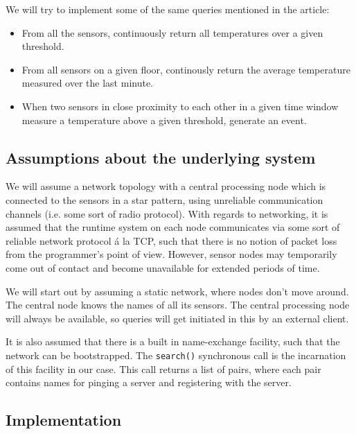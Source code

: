We will try to implement some of the same queries mentioned in the
article:

\begin{itemize}
\item
  From all the sensors, continuously return all temperatures over a
  given threshold.

\item
  From all sensors on a given floor, continously return the average
  temperature measured over the last minute.

\item
  When two sensors in close proximity to each other in a given time
  window measure a temperature above a given threshold, generate an
  event.

\end{itemize}
\subsection{Assumptions about the underlying system}

We will assume a network topology with a central processing node which is
connected to the sensors in a star pattern, using unreliable communication
channels (i.e. some sort of radio protocol).  With regards to networking, it is
assumed that the runtime system on each node communicates via some sort of
reliable network protocol á la TCP, such that there is no notion of
packet loss from the programmer's point of view.  However, sensor nodes may
temporarily come out of contact and become unavailable for extended periods of
time.

We will start out by assuming a static network, where nodes don't
move around. The central node knows the names of all its sensors.
The central processing node will always be available, so queries
will get initiated in this by an external client.

It is also assumed that there is a built in name-exchange facility,
such that the network can be bootstrapped. The \texttt{search()}
synchronous call is the incarnation of this facility in our case.
This call returns a list of pairs, where each pair contains names for
pinging a server and registering with the server.

\subsection{Implementation}

